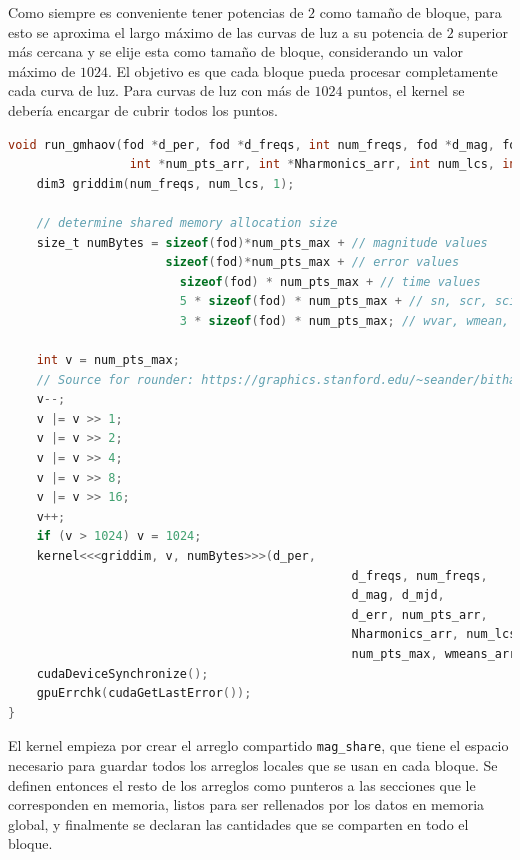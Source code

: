 Como siempre es conveniente tener potencias de $2$ como tamaño de bloque, para esto se aproxima el largo máximo de las curvas de luz a su potencia de $2$ superior más cercana y se elije esta como tamaño de bloque, considerando un valor máximo de $1024$. El objetivo es que cada bloque pueda procesar completamente cada curva de luz. Para curvas de luz con más de $1024$ puntos, el kernel se debería encargar de cubrir todos los puntos.
\begin{lstlisting}[language=C]
void run_gmhaov(fod *d_per, fod *d_freqs, int num_freqs, fod *d_mag, fod *d_mjd, fod *d_err,
                 int *num_pts_arr, int *Nharmonics_arr, int num_lcs, int num_pts_max, float *wmeans_arr, float *wvars_arr){
    dim3 griddim(num_freqs, num_lcs, 1); 

    // determine shared memory allocation size
    size_t numBytes = sizeof(fod)*num_pts_max + // magnitude values
                      sizeof(fod)*num_pts_max + // error values
                        sizeof(fod) * num_pts_max + // time values
                        5 * sizeof(fod) * num_pts_max + // sn, scr, sci, alr, ali to sum
                        3 * sizeof(fod) * num_pts_max; // wvar, wmean, w_sum to sum

    int v = num_pts_max;
    // Source for rounder: https://graphics.stanford.edu/~seander/bithacks.html#RoundUpPowerOf2
    v--;
    v |= v >> 1;
    v |= v >> 2;
    v |= v >> 4;
    v |= v >> 8;
    v |= v >> 16;
    v++;
    if (v > 1024) v = 1024;
    kernel<<<griddim, v, numBytes>>>(d_per,
                                                d_freqs, num_freqs,
                                                d_mag, d_mjd,
                                                d_err, num_pts_arr,
                                                Nharmonics_arr, num_lcs,
                                                num_pts_max, wmeans_arr, wvars_arr);
    cudaDeviceSynchronize();
    gpuErrchk(cudaGetLastError());
}
\end{lstlisting}

El kernel empieza por crear el arreglo compartido \texttt{mag\_share}, que tiene el espacio necesario para guardar todos los arreglos locales que se usan en cada bloque. Se definen entonces el resto de los arreglos como punteros a las secciones que le corresponden en memoria, listos para ser rellenados por los datos en memoria global, y finalmente se declaran las cantidades que se comparten en todo el bloque.


